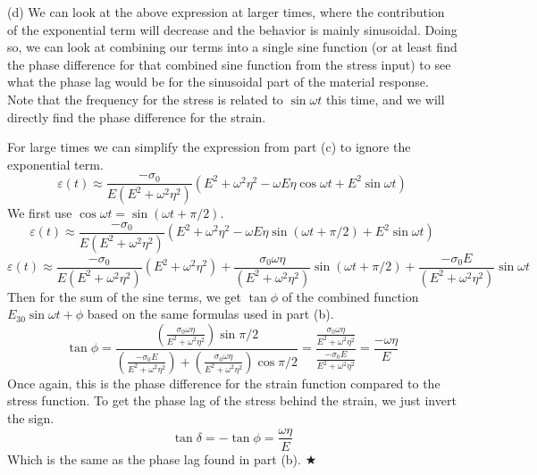 \documentclass[preprint,12pt,authoryear]{elsarticle}
\begin{document}
(d) We can look at the above expression at larger times, where the contribution of the exponential term will decrease and the behavior is mainly sinusoidal. Doing so, we can look at combining our terms into a single sine function (or at least find the phase difference for that combined sine function from the stress input) to see what the phase lag would be for the sinusoidal part of the material response. Note that the frequency for the stress is related to $\sin{\omega t}$ this time, and we will directly find the phase difference for the strain.

For large times we can simplify the expression from part (c) to ignore the exponential term.
\begin{equation}
     \varepsilon(t) \approx \frac{-\sigma_0}{E(E^2 + \omega^2 \eta^2)}(E^2 + \omega^2 \eta^2 - \omega E \eta \cos{\omega t} + E^2 \sin{\omega t})
\end{equation}
We first use $\cos{\omega t} = \sin{(\omega t + \pi/2)}$.
\begin{equation}
     \varepsilon(t) \approx \frac{-\sigma_0}{E(E^2 + \omega^2 \eta^2)}(E^2 + \omega^2 \eta^2 - \omega E \eta \sin{(\omega t +\pi/2)} + E^2 \sin{\omega t})
\end{equation}
\begin{equation}
     \varepsilon(t) \approx \frac{-\sigma_0}{E(E^2 + \omega^2 \eta^2)}(E^2 + \omega^2 \eta^2) + \frac{\sigma_0 \omega\eta}{(E^2 + \omega^2 \eta^2)} \sin{(\omega t +\pi/2)} + \frac{-\sigma_0 E}{(E^2 + \omega^2 \eta^2)} \sin{\omega t}
\end{equation}
Then for the sum of the sine terms, we get $\tan{\phi}$ of the combined function $E_{30}\sin{\omega t + \phi}$ based on the same formulas used in part (b).
\begin{equation}
    \tan{\phi} = \frac{(\frac{\sigma_0 \omega\eta}{E^2 + \omega^2 \eta^2})\sin{\pi/2}}{(\frac{-\sigma_0 E}{E^2 + \omega^2 \eta^2}) + (\frac{\sigma_0 \omega\eta}{E^2 + \omega^2 \eta^2})\cos{\pi/2}} = \frac{\frac{\sigma_0 \omega\eta}{E^2 + \omega^2 \eta^2}}{\frac{-\sigma_0 E}{E^2 + \omega^2 \eta^2}} = \frac{-\omega \eta}{E}
\end{equation}
Once again, this is the phase difference for the strain function compared to the stress function. To get the phase lag of the stress behind the strain, we just invert the sign.
\begin{equation}
    \tan{\delta} = -\tan{\phi} = \frac{\omega \eta}{E}
\end{equation}
Which is the same as the phase lag found in part (b).
\hspace*{\fill} $\bigstar$
\end{document}
